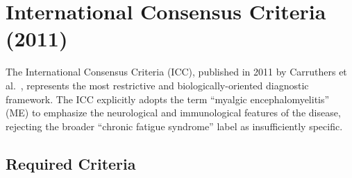 \section{International Consensus Criteria (2011)}
\label{sec:icc}

The International Consensus Criteria (ICC), published in 2011 by Carruthers et al.~\cite{Carruthers2011}, represents the most restrictive and biologically-oriented diagnostic framework. The ICC explicitly adopts the term ``myalgic encephalomyelitis'' (ME) to emphasize the neurological and immunological features of the disease, rejecting the broader ``chronic fatigue syndrome'' label as insufficiently specific.

\subsection{Required Criteria}


